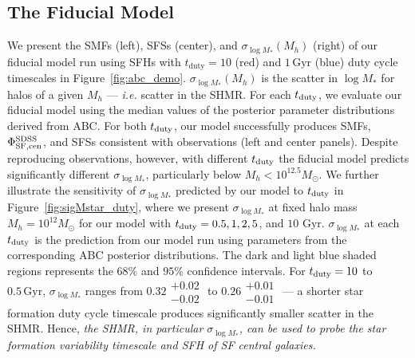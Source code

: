 \documentclass[12pt, letterpaper, preprint, tighten]{aastex62}
\newcommand{\edt}[1]{{\color{dred}{\bf} #1}}
\newcommand{\tduty}{t_{\rm duty}}
\newcommand{\siglogm}{\sigma_{\log M_*}}
\begin{document}
\subsection{\edt{The Fiducial Model}} \label{sec:sfdutycycle}
We present the SMFs (left), SFSs (center), and 
\edt{$\siglogm(M_h)$ (right) of our fiducial model run using SFHs with 
$t_\mathrm{duty} = 10$ (red) and $1\,\mathrm{Gyr}$ (blue) duty cycle timescales 
in Figure~\ref{fig:abc_demo}. $\siglogm(M_h)$ is the scatter in $\log M_*$ for 
halos of a given $M_h$ --- \emph{i.e.} scatter in the SHMR.} For each $\tduty$,
we evaluate our fiducial model using the median values of the posterior parameter 
distributions derived from ABC. For both $\tduty$, our model successfully produces 
SMFs, $\Phi^{\rm SDSS}_{\rm SF,cen}$, and SFSs consistent with observations (left 
and center panels). Despite reproducing observations, however, with different 
$t_{\rm duty}$ the fiducial model predicts significantly different $\siglogm$, 
particularly below $M_h < 10^{12.5}M_\odot$. We further illustrate the sensitivity 
of $\siglogm$ predicted by our model to $\tduty$ in Figure~\ref{fig:sigMstar_duty}, 
where we present $\siglogm$ at fixed halo mass $M_h = 10^{12} M_\odot$ for our 
model with $t_{\rm duty} = 0.5, 1, 2, 5$, and $10$ Gyr. $\siglogm$ at each $t_{\rm duty}$
is the prediction from our model run using parameters from the corresponding ABC 
posterior distributions. The dark and light blue shaded regions represents the 
$68\%$ and $95\%$ confidence intervals. For $t_{\rm duty} = 10$ to $0.5\,\mathrm{Gyr}$,
$\siglogm$ ranges from $0.32\substack{+0.02\\ -0.02}$ to $0.26\substack{+0.01\\-0.01}$
--- a shorter star formation duty cycle timescale produces significantly
smaller scatter in the SHMR. 
\edt{Hence, \emph{the SHMR, in particular $\siglogm$, can be used to probe the 
star formation variability timescale and SFH of SF central galaxies.}}
\end{document}

